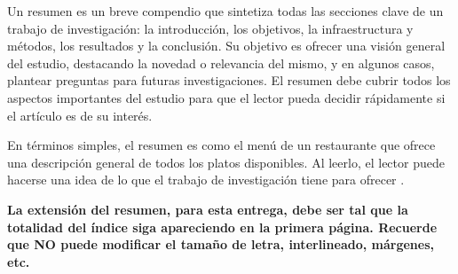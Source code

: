 Un resumen es un breve compendio que sintetiza todas las secciones clave de un trabajo de investigación: la introducción, los objetivos, la infraestructura y métodos, los resultados y la conclusión. Su objetivo es ofrecer una visión general del estudio, destacando la novedad o relevancia del mismo, y en algunos casos, plantear preguntas para futuras investigaciones. El resumen debe cubrir todos los aspectos importantes del estudio para que el lector pueda decidir rápidamente si el artículo es de su interés.

En términos simples, el resumen es como el menú de un restaurante que ofrece una descripción general de todos los platos disponibles. Al leerlo, el lector puede hacerse una idea de lo que el trabajo de investigación tiene para ofrecer \cite{elsevier_abstract_2024}.

\textbf{La extensión del resumen, para esta entrega, debe ser tal que la totalidad del índice siga apareciendo en la primera página. Recuerde que NO puede modificar el tamaño de letra, interlineado, márgenes, etc.}

